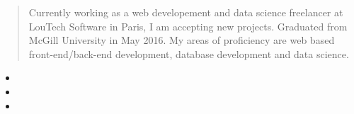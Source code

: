 \begin{quote}
Currently working as a web developement and data science freelancer at LouTech Software in Paris, I am accepting new projects. Graduated from McGill University in May 2016.
My areas of proficiency are web based front-end/back-end development, database development and data science.
\end{quote}





\divider\smallskip


\divider\smallskip


\divider\smallskip



\divider\smallskip






\begin{minipage}{0.20\textwidth}
\end{minipage}%
\begin{minipage}{0.22\textwidth}
\end{minipage}%
\begin{minipage}{0.15\textwidth}
\end{minipage}%








\begin{itemize}
\item{}
\item{}
\item{}
\end{itemize}





